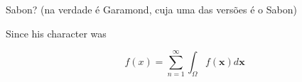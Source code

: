 \documentclass{article}
\begin{document}
Sabon? (na verdade é Garamond, cuja uma das versões é o Sabon)

Since his character was

%
\[
    f(x) = \sum_{n=1}^{\infty} \int_{\Omega} f(\mathbf{x}) d\mathbf{x}
\]
%
\end{document}
